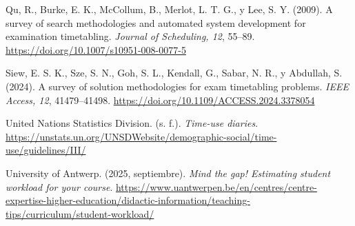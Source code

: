 \documentclass[12pt,letterpaper]{article}
\begin{document}
\hangindent=0.5in Qu, R., Burke, E. K., McCollum, B., Merlot, L. T. G., y Lee, S. Y. (2009). A survey of search methodologies and automated system development for examination timetabling. \textit{Journal of Scheduling, 12}, 55--89. \url{https://doi.org/10.1007/s10951-008-0077-5}

\hangindent=0.5in Siew, E. S. K., Sze, S. N., Goh, S. L., Kendall, G., Sabar, N. R., y Abdullah, S. (2024). A survey of solution methodologies for exam timetabling problems. \textit{IEEE Access, 12}, 41479--41498. \url{https://doi.org/10.1109/ACCESS.2024.3378054}

\hangindent=0.5in United Nations Statistics Division. (s. f.). \textit{Time-use diaries}.  \url{https://unstats.un.org/UNSDWebsite/demographic-social/time-use/guidelines/III/}

\hangindent=0.5in University of Antwerp. (2025, septiembre). \textit{Mind the gap! Estimating student workload for your course}.  \url{https://www.uantwerpen.be/en/centres/centre-expertise-higher-education/didactic-information/teaching-tips/curriculum/student-workload/}

\endgroup
\end{document}
